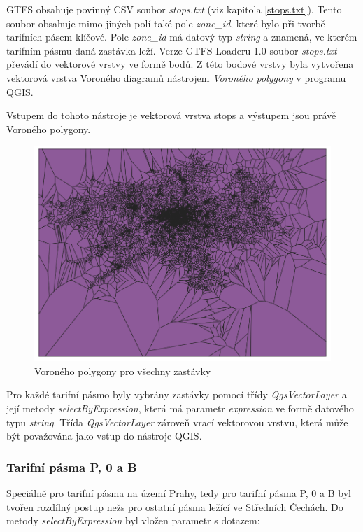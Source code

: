 GTFS obsahuje povinný CSV soubor \textit{stops.txt} (viz kapitola \ref{stops.txt}). Tento soubor obsahuje mimo
jiných polí také pole \textit{zone\_id}, které bylo při tvorbě tarifních pásem klíčové. 
Pole \textit{zone\_id} má datový typ \textit{string} a znamená, ve kterém tarifním
pásmu daná zastávka leží. Verze GTFS Loaderu 1.0 soubor \textit{stops.txt} převádí do vektorové vrstvy
ve formě bodů. Z této bodové vrstvy byla vytvořena vektorová vrstva Voroného 
diagramů nástrojem \textit{Voroného polygony} v programu QGIS. 

Vstupem do tohoto nástroje je vektorová vrstva stops a výstupem jsou právě Voroného polygony.

\begin{figure}[H] \centering
    \includegraphics[width=400pt]{./pictures/voronoi-stops.png}
    \caption[Voroného polygony pro všechny zastávky]{Voroného polygony pro všechny zastávky}
	\label{fig:voronoi-stops}              
\end{figure}
  
Pro každé tarifní pásmo byly vybrány zastávky pomocí třídy \textit{QgsVectorLayer}
a její metody \textit{selectByExpression}, která má parametr \textit{expression} ve formě datového
typu \textit{string}. 
Třída \textit{QgsVectorLayer} zároveň vrací vektorovou vrstvu, která může být považována jako vstup do nástroje QGIS.

\subsubsection{Tarifní pásma P, 0 a B}

Speciálně pro tarifní pásma na území Prahy, tedy pro tarifní pásma P, 0 a B byl tvořen rozdílný postup
nežs pro ostatní pásma ležící ve Středních Čechách. Do metody \textit{selectByExpression} byl vložen
parametr s dotazem: 

